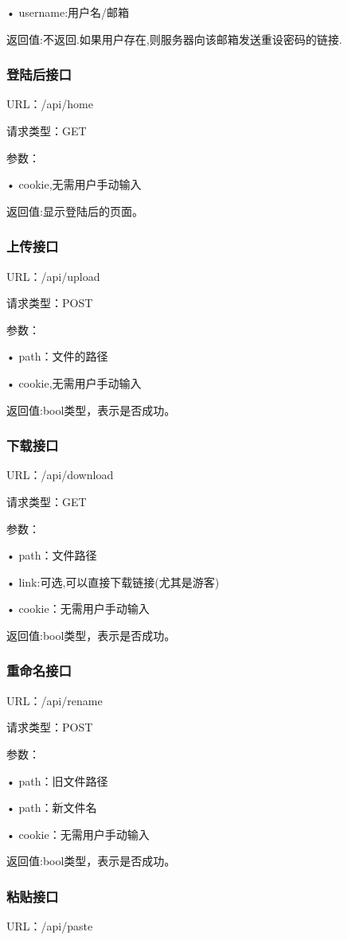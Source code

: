 • username:用户名/邮箱

返回值:不返回.如果用户存在,则服务器向该邮箱发送重设密码的链接.

\subsubsection{登陆后接口}
URL：/api/home

请求类型：GET

参数：

• cookie,无需用户手动输入

返回值:显示登陆后的页面。

\subsubsection{上传接口}
URL：/api/upload

请求类型：POST

参数：

• path：文件的路径

• cookie,无需用户手动输入

返回值:bool类型，表示是否成功。

\subsubsection{下载接口}
URL：/api/download

请求类型：GET

参数：

• path：文件路径

• link:可选,可以直接下载链接(尤其是游客)

• cookie：无需用户手动输入

返回值:bool类型，表示是否成功。

\subsubsection{重命名接口}
URL：/api/rename

请求类型：POST

参数：

• path：旧文件路径

• path：新文件名

• cookie：无需用户手动输入

返回值:bool类型，表示是否成功。

\subsubsection{粘贴接口}
URL：/api/paste

